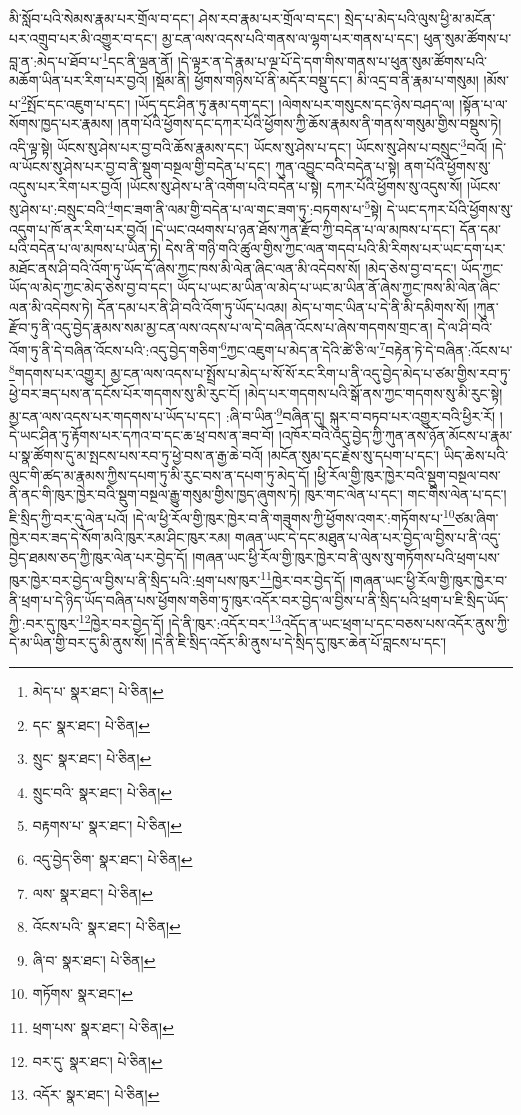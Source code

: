མི་སློབ་པའི་སེམས་རྣམ་པར་གྲོལ་བ་དང་། ཤེས་རབ་རྣམ་པར་གྲོལ་བ་དང་། སྲེད་པ་མེད་པའི་ལུས་ཕྱི་མ་མངོན་པར་འགྲུབ་པར་མི་འགྱུར་བ་དང་། མྱ་ངན་ལས་འདས་པའི་གནས་ལ་ལྷག་པར་གནས་པ་དང་། ཕུན་སུམ་ཚོགས་པ་བླ་ན་:མེད་པ་ཐོབ་པ་\footnote{མེད་པ་  སྣར་ཐང་།  པེ་ཅིན། }དང་ནི་ལྡན་ནོ། །དེ་ལྟར་ན་དེ་རྣམ་པ་ལྔ་པོ་དེ་དག་གིས་གནས་པ་ཕུན་སུམ་ཚོགས་པའི་མཆོག་ཡིན་པར་རིག་པར་བྱའོ། །སྡོམ་ནི། ཕྱོགས་གཉིས་པོ་ནི་མདོར་བསྡུ་དང་། མི་འདྲ་བ་ནི་རྣམ་པ་གསུམ། །མོས་པ་\footnote{དང་  སྣར་ཐང་།  པེ་ཅིན། }སྤོང་དང་འཇུག་པ་དང་། །ཡོད་དང་ཤིན་ཏུ་རྣམ་དག་དང་། །ལེགས་པར་གསུངས་དང་ཉེས་བཤད་ལ། །སྟོན་པ་ལ་སོགས་ཁྱད་པར་རྣམས། །ནག་པོའི་ཕྱོགས་དང་དཀར་པོའི་ཕྱོགས་ཀྱི་ཆོས་རྣམས་ནི་གནས་གསུམ་གྱིས་བསྡུས་ཏེ། འདི་ལྟ་སྟེ། ཡོངས་སུ་ཤེས་པར་བྱ་བའི་ཆོས་རྣམས་དང་། ཡོངས་སུ་ཤེས་པ་དང་། ཡོངས་སུ་ཤེས་པ་བསྲུང་\footnote{སྲུང་  སྣར་ཐང་།  པེ་ཅིན། }བའོ། །དེ་ལ་ཡོངས་སུ་ཤེས་པར་བྱ་བ་ནི་སྡུག་བསྔལ་གྱི་བདེན་པ་དང་། ཀུན་འབྱུང་བའི་བདེན་པ་སྟེ། ནག་པོའི་ཕྱོགས་སུ་འདུས་པར་རིག་པར་བྱའོ། །ཡོངས་སུ་ཤེས་པ་ནི་འགོག་པའི་བདེན་པ་སྟེ། དཀར་པོའི་ཕྱོགས་སུ་འདུས་སོ། །ཡོངས་སུ་ཤེས་པ་:བསྲུང་བའི་\footnote{སྲུང་བའི་  སྣར་ཐང་།  པེ་ཅིན། }གང་ཟག་ནི་ལམ་གྱི་བདེན་པ་ལ་གང་ཟག་ཏུ་:བཏགས་པ་\footnote{བརྟགས་པ་  སྣར་ཐང་།  པེ་ཅིན། }སྟེ། དེ་ཡང་དཀར་པོའི་ཕྱོགས་སུ་འདུག་པ་ཁོ་ནར་རིག་པར་བྱའོ། །དེ་ཡང་འཕགས་པ་ཉན་ཐོས་ཀུན་རྫོབ་ཀྱི་བདེན་པ་ལ་མཁས་པ་དང་། དོན་དམ་པའི་བདེན་པ་ལ་མཁས་པ་ཡིན་ཏེ། དེས་ནི་གཉི་གའི་ཚུལ་གྱིས་ཀྱང་ལན་གདབ་པའི་མི་རིགས་པར་ཡང་དག་པར་མཐོང་ནས་ཤི་བའི་འོག་ཏུ་ཡོད་དོ་ཞེས་ཀྱང་ཁས་མི་ལེན་ཞིང་ལན་མི་འདེབས་སོ། །མེད་ཅེས་བྱ་བ་དང་། ཡོད་ཀྱང་ཡོད་ལ་མེད་ཀྱང་མེད་ཅེས་བྱ་བ་དང་། ཡོད་པ་ཡང་མ་ཡིན་ལ་མེད་པ་ཡང་མ་ཡིན་ནོ་ཞེས་ཀྱང་ཁས་མི་ལེན་ཞིང་ལན་མི་འདེབས་ཏེ། དོན་དམ་པར་ནི་ཤི་བའི་འོག་ཏུ་ཡོད་པའམ། མེད་པ་གང་ཡིན་པ་དེ་ནི་མི་དམིགས་སོ། །ཀུན་རྫོབ་ཏུ་ནི་འདུ་བྱེད་རྣམས་སམ་མྱ་ངན་ལས་འདས་པ་ལ་དེ་བཞིན་འོངས་པ་ཞེས་གདགས་གྲང་ན། དེ་ལ་ཤི་བའི་འོག་ཏུ་ནི་དེ་བཞིན་འོངས་པའི་:འདུ་བྱེད་གཅིག་\footnote{འདུ་བྱེད་ཅིག་  སྣར་ཐང་།  པེ་ཅིན། }ཀྱང་འཇུག་པ་མེད་ན་དེའི་ཚེ་ཅི་ལ་\footnote{ལས་  སྣར་ཐང་།  པེ་ཅིན། }བརྟེན་ཏེ་དེ་བཞིན་:འོངས་པ་\footnote{འོངས་པའི་  སྣར་ཐང་།  པེ་ཅིན། }གདགས་པར་འགྱུར། མྱ་ངན་ལས་འདས་པ་སྤྲོས་པ་མེད་པ་སོ་སོ་རང་རིག་པ་ནི་འདུ་བྱེད་མེད་པ་ཙམ་གྱིས་རབ་ཏུ་ཕྱེ་བར་ཟད་པས་ན་དངོས་པོར་གདགས་སུ་མི་རུང་ངོ། །མེད་པར་གདགས་པའི་སྒོ་ནས་ཀྱང་གདགས་སུ་མི་རུང་སྟེ། མྱ་ངན་ལས་འདས་པར་གདགས་པ་ཡོད་པ་དང་། :ཞི་བ་ཡིན་\footnote{ཞི་བ་  སྣར་ཐང་།  པེ་ཅིན། }བཞིན་དུ། སྐུར་བ་བཏབ་པར་འགྱུར་བའི་ཕྱིར་རོ། །དེ་ཡང་ཤིན་ཏུ་རྟོགས་པར་དཀའ་བ་དང་ཆ་ཕྲ་བས་ན་ཟབ་བོ། །འཁོར་བའི་འདུ་བྱེད་ཀྱི་ཀུན་ནས་ཉོན་མོངས་པ་རྣམ་པ་སྣ་ཚོགས་དུ་མ་སྤངས་པས་རབ་ཏུ་ཕྱེ་བས་ན་རྒྱ་ཆེ་བའོ། །མངོན་སུམ་དང་རྗེས་སུ་དཔག་པ་དང་། ཡིད་ཆེས་པའི་ལུང་གི་ཚད་མ་རྣམས་ཀྱིས་དཔག་ཏུ་མི་རུང་བས་ན་དཔག་ཏུ་མེད་དོ། །ཕྱི་རོལ་གྱི་ཁུར་ཁྱེར་བའི་སྡུག་བསྔལ་བས་ནི་ནང་གི་ཁུར་ཁྱེར་བའི་སྡུག་བསྔལ་རྒྱུ་གསུམ་གྱིས་ཁྱད་ཞུགས་ཏེ། ཁུར་གང་ལེན་པ་དང་། གང་གིས་ལེན་པ་དང་། ཇི་སྲིད་ཀྱི་བར་དུ་ལེན་པའོ། །དེ་ལ་ཕྱི་རོལ་གྱི་ཁུར་ཁྱེར་བ་ནི་གཟུགས་ཀྱི་ཕྱོགས་འགར་:གཏོགས་པ་\footnote{གཏོགས་  སྣར་ཐང་། }ཙམ་ཞིག་ཁྱེར་བར་ཟད་དེ་སོག་མའི་ཁུར་རམ་ཤིང་ཁུར་རམ། གཞན་ཡང་དེ་དང་མཐུན་པ་ལེན་པར་བྱེད་ལ་བྱིས་པ་ནི་འདུ་བྱེད་ཐམས་ཅད་ཀྱི་ཁུར་ལེན་པར་བྱེད་དོ། །གཞན་ཡང་ཕྱི་རོལ་གྱི་ཁུར་ཁྱེར་བ་ནི་ལུས་སུ་གཏོགས་པའི་ཕྲག་པས་ཁུར་ཁྱེར་བར་བྱེད་ལ་བྱིས་པ་ནི་སྲིད་པའི་:ཕྲག་པས་ཁུར་\footnote{ཕྲག་པས་  སྣར་ཐང་།  པེ་ཅིན། }ཁྱེར་བར་བྱེད་དོ། །གཞན་ཡང་ཕྱི་རོལ་གྱི་ཁུར་ཁྱེར་བ་ནི་ཕྲག་པ་དེ་ཉིད་ཡོད་བཞིན་པས་ཕྱོགས་གཅིག་ཏུ་ཁུར་འདོར་བར་བྱེད་ལ་བྱིས་པ་ནི་སྲིད་པའི་ཕྲག་པ་ཇི་སྲིད་ཡོད་ཀྱི་:བར་དུ་ཁུར་\footnote{བར་དུ་  སྣར་ཐང་།  པེ་ཅིན། }ཁྱེར་བར་བྱེད་དོ། །དེ་ནི་ཁུར་:འདོར་བར་\footnote{འདོར་  སྣར་ཐང་།  པེ་ཅིན། }འདོད་ན་ཡང་ཕྲག་པ་དང་བཅས་པས་འདོར་ནུས་ཀྱི་དེ་མ་ཡིན་གྱི་བར་དུ་མི་ནུས་སོ། །དེ་ནི་ཇི་སྲིད་འདོར་མི་ནུས་པ་དེ་སྲིད་དུ་ཁུར་ཆེན་པོ་བླངས་པ་དང་། 